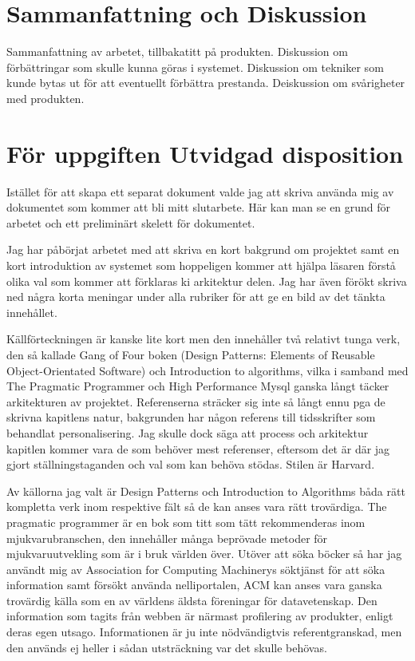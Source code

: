 \section{Sammanfattning och Diskussion}

Sammanfattning av arbetet, tillbakatitt på produkten. Diskussion om förbättringar som skulle kunna göras i systemet. Diskussion om tekniker som kunde bytas ut för att eventuellt förbättra prestanda. Deiskussion om svårigheter med produkten.

\section{För uppgiften Utvidgad disposition}

Istället för att skapa ett separat dokument valde jag att skriva använda mig av dokumentet som kommer att bli mitt slutarbete. Här kan man se en grund för arbetet och ett preliminärt skelett för dokumentet.

Jag har påbörjat arbetet med att skriva en kort bakgrund om projektet samt en kort introduktion av systemet som hoppeligen kommer att hjälpa läsaren förstå olika val som kommer att förklaras ki arkitektur delen. Jag har även förökt skriva ned några korta meningar under alla rubriker för att ge en bild av det tänkta innehållet.

Källförteckningen är kanske lite kort men den innehåller två relativt tunga verk, den så kallade Gang of Four boken (Design Patterns: Elements of Reusable Object-Orientated Software) och Introduction to algorithms, vilka i samband med The Pragmatic Programmer och High Performance Mysql ganska långt täcker arkitekturen av projektet. Referenserna sträcker sig inte så långt ennu pga de skrivna kapitlens natur, bakgrunden har någon referens till tidsskrifter som behandlat personalisering. Jag skulle dock säga att process och arkitektur kapitlen kommer vara de som behöver mest referenser, eftersom det är där jag gjort ställningstaganden och val som kan behöva stödas. Stilen är Harvard.

Av källorna jag valt är Design Patterns och Introduction to Algorithms båda rätt kompletta verk inom respektive fält så de kan anses vara rätt trovärdiga. The pragmatic programmer är en bok som titt som tätt rekommenderas inom mjukvarubranschen, den innehåller många beprövade metoder för mjukvaruutvekling som är i bruk världen över. Utöver att söka böcker så har jag användt mig av Association for Computing Machinerys söktjänst för att söka information samt försökt använda nelliportalen, ACM kan anses vara ganska trovärdig källa som en av världens äldsta föreningar för datavetenskap. Den information som tagits från webben är närmast profilering av produkter, enligt deras egen utsago. Informationen är ju inte nödvändigtvis referentgranskad, men den används ej heller i sådan utsträckning var det skulle behövas.


